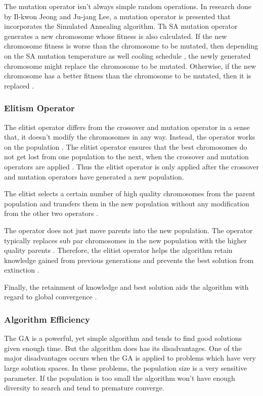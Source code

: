 The mutation operator isn't always simple random operations. In research done by Il-kwon Jeong and Ju-jang Lee, a mutation operator is presented that incorporates the Simulated Annealing algorithm. Th SA mutation operator generates a new chromosome whose fitness is also calculated. If the new chromosome fitness is worse than the chromosome to be mutated, then depending on the SA mutation temperature as well cooling schedule , the newly generated chromosome might replace the chromosome to be mutated. Otherwise, if the new chromosome has a better fitness than the chromosome to be mutated, then it is replaced \cite{AdaptiveSAGA}.

\subsubsection{Elitism Operator}
The elitist operator differs from the crossover and mutation operator in a sense that, it doesn't modify the chromosomes in any way. Instead, the operator works on the population \cite{PatternDetectionGA}. The elitist operator ensures that the best chromosomes do not get lost from one population to the next, when the crossover and mutation operators are applied \cite{HetergeneousGA}. Thus the elitist operator is only applied after the crossover and mutation operators have generated a new population. 

The elitist selects a certain number of high quality chromosomes from the parent population and transfers them in the new population without any modification from the other two operators \cite{PatternDetectionGA}. 

The operator does not just move parents into the new population. The operator typically replaces sub par chromosomes in the new population with the higher quality parents \cite{RealParameterGASA}. Therefore, the elitist operator helps the algorithm retain knowledge gained from previous generations and prevents the best solution from extinction \cite{DynamicPenaltyGA}. 

Finally, the retainment of knowledge and best solution aids the algorithm with regard to global convergence \cite{SelfAdaptiveDataMiningGA}.

\subsubsection{Algorithm Efficiency}
The GA is a powerful, yet simple algorithm and tends to find good solutions given enough time. But the algorithm does has its disadvantages. One of the major disadvantages occurs when the GA is applied to problems which have very large solution spaces. In these problems, the population size is a very sensitive parameter. If the population is too small the algorithm won't have enough diversity to search and tend to premature converge. 

